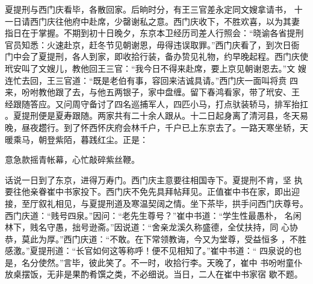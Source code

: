 夏提刑与西门庆看毕，各散回家。后晌时分，有王三官差永定同文嫂拿请书，
十一日请西门庆往他府中赴席，少罄谢私之意。西门庆收下，不胜欢喜，以为其妻
指日在于掌握。不期到初十日晚夕，东京本卫经历司差人行照会：“晓谕各省提刑
官员知悉：火速赴京，赶冬节见朝谢恩，毋得违误取罪。”西门庆看了，到次日衙
门中会了夏提刑，各人到家，即收拾行装，备办贽见礼物，约早晚起程。西门庆使
玳安叫了文嫂儿，教他回王三官：“我今日不得来赴席，要上京见朝谢恩去。”文
嫂连忙去回，王三官道：“既是老伯有事，容回来洁诚具请。”西门庆一面叫将贲
四来，吩咐教他跟了去，与他五两银子，家中盘缠。留下春鸿看家，带了玳安、王
经跟随答应。又问周守备讨了四名巡捕军人，四匹小马，打点驮装轿马，排军抬扛
。夏提刑便是夏寿跟随。两家共有二十余人跟从。十二日起身离了清河县，冬天易
晚，昼夜趱行。到了怀西怀庆府会林千户，千户已上东京去了。一路天寒坐轿，天
暖乘马，朝登紫陌，暮践红尘。正是：

意急款摇青帐幕，心忙敲碎紫丝鞭。

话说一日到了东京，进得万寿门。西门庆主意要往相国寺下。夏提刑不肯，坚
执要往他亲眷崔中书家投下。西门庆不免先具拜帖拜见。正值崔中书在家，即出迎
接，至厅叙礼相见，与夏提刑道及寒温契阔之情。坐下茶毕，拱手问西门庆尊号。
西门庆道：“贱号四泉。”因问：“老先生尊号？”崔中书道：“学生性最愚朴，
名闲林下，贱名守愚，拙号逊斋。”因说道：“舍亲龙溪久称盛德，全仗扶持，同
心协恭，莫此为厚。”西门庆道：“不敢。在下常领教诲，今又为堂尊，受益恒多
，不胜感激。”夏提刑道：“长官如何这等称呼！便不见相知了。”崔中书道：“
四泉说的也是，名分使然。”言毕，彼此笑了。不一时，收拾行李。天晚了，崔中
书吩咐童仆放桌摆饭，无非是果酌肴馔之类，不必细说。当日，二人在崔中书家宿
歇不题。

